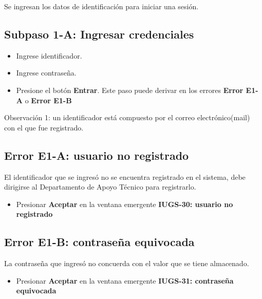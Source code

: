 Se ingresan los datos de identificación para iniciar una sesión.
\subsection{Subpaso 1-A: Ingresar credenciales}
\begin{itemize}
	\item Ingrese identificador.
	\item Ingrese contraseña.
	\item Presione el botón \textbf{Entrar}. Este paso puede derivar
		en los errores \textbf{Error E1-A} o \textbf{Error E1-B}
\end{itemize}
Observación 1: un identificador está compuesto por el correo electrónico(mail) con el que fue registrado.
	

\subsection{Error E1-A: usuario no registrado}
El identificador que se ingresó no se encuentra registrado en el sistema,
debe dirigirse al Departamento de Apoyo Técnico para registrarlo.
\begin{itemize}
	\item Presionar \textbf{Aceptar} en la ventana emergente 
		\textbf{IUGS-30: usuario no registrado}
\end{itemize}

\subsection{Error E1-B: contraseña equivocada}
La contraseña que ingresó no concuerda con el valor que se tiene almacenado.
\begin{itemize}
	\item Presionar \textbf{Aceptar} en la ventana emergente 
		\textbf{IUGS-31: contraseña equivocada}
\end{itemize}

